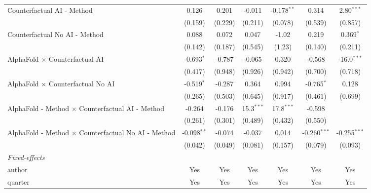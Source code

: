 \begin{tabular}{lcccccc}
   Counterfactual AI - Method                                 & 0.126         & 0.201   & -0.011       & -0.178$^{**}$ & 0.314          & 2.80$^{***}$\\   
                                                              & (0.159)       & (0.229) & (0.211)      & (0.078)       & (0.539)        & (0.857)\\   
   Counterfactual No AI - Method                              & 0.088         & 0.072   & 0.047        & -1.02         & 0.219          & 0.369$^{*}$\\   
                                                              & (0.142)       & (0.187) & (0.545)      & (1.23)        & (0.140)        & (0.211)\\   
   AlphaFold $\times$ Counterfactual AI                       & -0.693$^{*}$  & -0.787  & -0.065       & 0.320         & -0.568         & -16.0$^{***}$\\   
                                                              & (0.417)       & (0.948) & (0.926)      & (0.942)       & (0.700)        & (0.718)\\   
   AlphaFold $\times$ Counterfactual No AI                    & -0.519$^{*}$  & -0.287  & 0.364        & 0.994         & -0.765$^{*}$   & 0.128\\   
                                                              & (0.265)       & (0.503) & (0.645)      & (0.917)       & (0.461)        & (0.699)\\   
   AlphaFold - Method $\times$ Counterfactual AI - Method     & -0.264        & -0.176  & 15.3$^{***}$ & 17.8$^{***}$  & -0.598         &   \\   
                                                              & (0.261)       & (0.301) & (0.489)      & (0.432)       & (0.550)        &   \\   
   AlphaFold - Method $\times$ Counterfactual No AI - Method  & -0.098$^{**}$ & -0.074  & -0.037       & 0.014         & -0.260$^{***}$ & -0.255$^{***}$\\   
                                                              & (0.042)       & (0.049) & (0.081)      & (0.157)       & (0.079)        & (0.093)\\   
   \midrule
   \emph{Fixed-effects}\\
   author                                                     & Yes           & Yes     & Yes          & Yes           & Yes            & Yes\\  
   quarter                                                    & Yes           & Yes     & Yes          & Yes           & Yes            & Yes\\  

\end{tabular}
